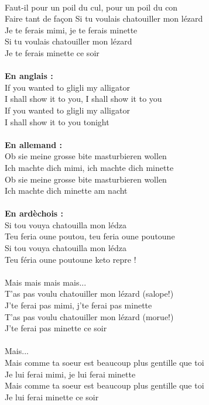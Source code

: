 \\Faut-il pour un poil du cul, pour un poil du con
\\Faire tant de façon
\breakpage
Si tu voulais chatouiller mon lézard
\\Je te ferais mimi, je te ferais minette
\\Si tu voulais chatouiller mon lézard
\\Je te ferais minette ce soir
\\\\\textbf{En anglais :}
\\If you wanted to gligli my alligator
\\I shall show it to you, I shall show it to you
\\If you wanted to gligli my alligator
\\I shall show it to you tonight
\\\\\textbf{En allemand :}
\\Ob sie meine grosse bite masturbieren wollen
\\Ich machte dich mimi, ich machte dich minette
\\Ob sie meine grosse bite masturbieren wollen
\\Ich machte dich minette am nacht
\\\\\textbf{En ardèchois :}
\\Si tou vouya chatouilla mon lédza
\\Teu feria oune poutou, teu feria oune poutoune
\\Si tou vouya chatouilla mon lédza
\\Teu féria oune poutoune keto repre !
\\\\Mais mais mais mais...
\\T'as pas voulu chatouiller mon lézard (salope!)
\\J'te ferai pas mimi, j'te ferai pas minette
\\T'as pas voulu chatouiller mon lézard (morue!)
\\J'te ferai pas minette ce soir
\\\\Mais...
\\Mais comme ta soeur est beaucoup plus gentille que toi
\\Je lui ferai mimi, je lui ferai minette
\\Mais comme ta soeur est beaucoup plus gentille que toi
\\Je lui ferai minette ce soir
